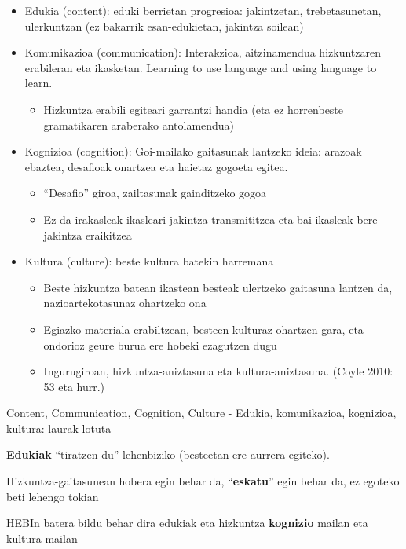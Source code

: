 \documentclass[
]{book}
\providecommand{\tightlist}{%
  \setlength{\itemsep}{0pt}\setlength{\parskip}{0pt}}
\begin{document}
\begin{itemize}
\tightlist
\item
  Edukia (content): eduki berrietan progresioa: jakintzetan, trebetasunetan, ulerkuntzan (ez bakarrik esan-edukietan, jakintza soilean)
\item
  Komunikazioa (communication): Interakzioa, aitzinamendua hizkuntzaren erabileran eta ikasketan. Learning to use language and using language to learn.

  \begin{itemize}
  \tightlist
  \item
    Hizkuntza erabili egiteari garrantzi handia (eta ez horrenbeste gramatikaren araberako antolamendua)
  \end{itemize}
\item
  Kognizioa (cognition): Goi-mailako gaitasunak lantzeko ideia: arazoak ebaztea, desafioak onartzea eta haietaz gogoeta egitea.

  \begin{itemize}
  \tightlist
  \item
    ``Desafio'' giroa, zailtasunak gainditzeko gogoa
  \item
    Ez da irakasleak ikasleari jakintza transmititzea eta bai ikasleak bere jakintza eraikitzea
  \end{itemize}
\item
  Kultura (culture): beste kultura batekin harremana

  \begin{itemize}
  \tightlist
  \item
    Beste hizkuntza batean ikastean besteak ulertzeko gaitasuna lantzen da, nazioartekotasunaz ohartzeko ona
  \item
    Egiazko materiala erabiltzean, besteen kulturaz ohartzen gara, eta ondorioz geure burua ere hobeki ezagutzen dugu
  \item
    Ingurugiroan, hizkuntza-aniztasuna eta kultura-aniztasuna. (Coyle 2010: 53 eta hurr.)
  \end{itemize}
\end{itemize}

Content, Communication, Cognition, Culture - Edukia, komunikazioa, kognizioa, kultura: laurak lotuta

\textbf{Edukiak} ``tiratzen du'' lehenbiziko (besteetan ere aurrera egiteko).

Hizkuntza-gaitasunean hobera egin behar da, ``\textbf{eskatu}'' egin behar da, ez egoteko beti lehengo tokian

HEBIn batera bildu behar dira edukiak eta hizkuntza \textbf{kognizio} mailan eta kultura mailan
\end{document}
